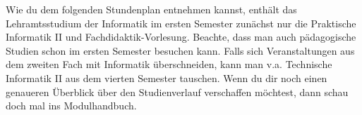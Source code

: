 Wie du dem folgenden Stundenplan entnehmen kannst, enthält das Lehramtsstudium der Informatik im ersten Semester zunächst nur die Praktische Informatik II und Fachdidaktik-Vorlesung.
Beachte, dass man auch pädagogische Studien schon im ersten Semester besuchen kann. Falls sich Veranstaltungen aus dem zweiten
Fach mit Informatik überschneiden, kann man v.a. Technische Informatik II aus dem vierten Semester tauschen.
Wenn du dir noch einen genaueren Überblick über den Studienverlauf verschaffen möchtest, dann schau doch mal ins Modulhandbuch.

\begin{center}
\end{center}

